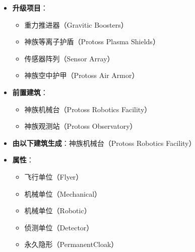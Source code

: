 \begin{tcolorbox}[colback=white, colframe=black!60!white, title=Protoss\_Observer(), arc=0mm]
\begin{itemize}
        \item \textbf{升级项目}：
            \begin{itemize}
                \item 重力推进器（Gravitic Boosters）
                \item 神族等离子护盾（Protoss Plasma Shields）
                \item 传感器阵列（Sensor Array）
                \item 神族空中护甲（Protoss Air Armor）
            \end{itemize}
        \item \textbf{前置建筑}：
            \begin{itemize}
                \item 神族机械台（Protoss Robotics Facility）
                \item 神族观测站（Protoss Observatory）
            \end{itemize}
        \item \textbf{由以下建筑生成}：神族机械台（Protoss Robotics Facility）
        \item \textbf{属性}：
            \begin{itemize}
                \item 飞行单位（Flyer）
                \item 机械单位（Mechanical）
                \item 机械单位（Robotic）
                \item 侦测单位（Detector）
                \item 永久隐形（PermanentCloak）
            \end{itemize}
    \end{itemize}
\end{tcolorbox}

